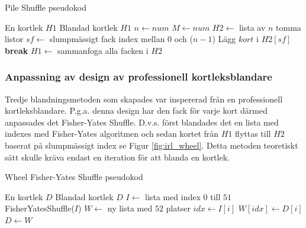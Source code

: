 \documentclass[swedish,a4paper]{article}
\begin{document}
\begin{algorithm}
\caption{Pile Shuffle pseudokod}
\label{alg:pile}
\begin{algorithmic}[1]
\Require En kortlek $H1$
\Ensure Blandad kortlek $H1$ 
\State $n \gets num$ 
\State $M \gets num $ 
\State $H2 \gets$ lista av $n$ tomma listor %
    \Loop
        \State $sf \gets$ slumpmässigt fack index mellan $0$ och ($n-1$) 
            \State Lägg $kort$ i $H2[sf]$
            \State \textbf{break}
        \EndIf
    \EndLoop
\EndFor
\State $H1 \gets$ sammanfoga alla facken i $H2$ 
\end{algorithmic}
\end{algorithm}


\subsubsection{Anpassning av design av professionell kortleksblandare}
Tredje blandningsmetoden som skapades var inspererad från en professionell
kortleksblandare. P.g.a. denna design har den fack för varje kort därmed anpassades det
Fisher-Yates Shuffle.
D.v.s. först blandades det en lista med indexes med
Fisher-Yates algoritmen och sedan kortet från $H1$ flyttas till $H2$ baserat på
slumpmässigt index se Figur \ref{fig:irl_wheel}. Detta metoden teoretiskt sätt
skulle kräva endast en iteration för att blanda en kortlek.

\begin{algorithm}
\caption{Wheel Fisher-Yates Shuffle pseudokod}
\label{alg:wheel}
\begin{algorithmic}[1]
\Require En kortlek $D$
\Ensure Blandad kortlek $D$ 
\State $I \gets$ lista med index $0$ till $51$ 
\State FisherYatesShuffle($I$) 
\State $W \gets$ ny lista med $52$ platser 
    \State $idx \gets I[i]$ 
    \State $W[idx] \gets D[i]$ 
\EndFor
\State $D \gets W$ 
\end{algorithmic}
\end{algorithm}
\end{document}
